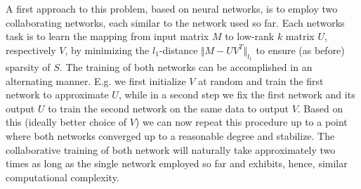 A first approach to this problem, based on neural networks, is to employ two collaborating networks, each similar to the network used so far. Each networks task is to learn the mapping from input matrix $M$ to low-rank $k$ matrix $U$, respectively $V$, by minimizing the $l_1$-distance $\Vert M- UV^T\Vert_{l_1}$ to ensure (as before) sparsity of $S$. The training of both networks can be accomplished in an alternating manner. E.g. we first initialize $V$ at random and train the first network to approximate $U$, while in a second step we fix the first network and its output $U$ to train the second network on the same data to output $V$. Based on this (ideally better choice of $V$) we can now repeat this procedure up to a point where both networks converged up to a reasonable degree and stabilize. The collaborative training of both network will naturally take approximately two times as long as the single network employed so far and exhibits, hence, similar computational complexity. 
